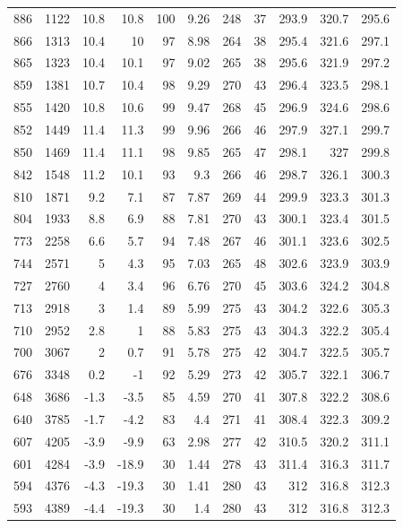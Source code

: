 \documentclass{article}
\begin{document}
\begin{longtable}{r|r|r|r|r|r|r|r|r|r|r}
886 & 1122 & 10.8 & 10.8 & 100 & 9.26 & 248 & 37 & 293.9 & 320.7 & 295.6 \\
866 & 1313 & 10.4 & 10 & 97 & 8.98 & 264 & 38 & 295.4 & 321.6 & 297.1 \\
865 & 1323 & 10.4 & 10.1 & 97 & 9.02 & 265 & 38 & 295.6 & 321.9 & 297.2 \\
859 & 1381 & 10.7 & 10.4 & 98 & 9.29 & 270 & 43 & 296.4 & 323.5 & 298.1 \\
855 & 1420 & 10.8 & 10.6 & 99 & 9.47 & 268 & 45 & 296.9 & 324.6 & 298.6 \\
852 & 1449 & 11.4 & 11.3 & 99 & 9.96 & 266 & 46 & 297.9 & 327.1 & 299.7 \\
850 & 1469 & 11.4 & 11.1 & 98 & 9.85 & 265 & 47 & 298.1 & 327 & 299.8 \\
842 & 1548 & 11.2 & 10.1 & 93 & 9.3 & 266 & 46 & 298.7 & 326.1 & 300.3 \\
810 & 1871 & 9.2 & 7.1 & 87 & 7.87 & 269 & 44 & 299.9 & 323.3 & 301.3 \\
804 & 1933 & 8.8 & 6.9 & 88 & 7.81 & 270 & 43 & 300.1 & 323.4 & 301.5 \\
773 & 2258 & 6.6 & 5.7 & 94 & 7.48 & 267 & 46 & 301.1 & 323.6 & 302.5 \\
744 & 2571 & 5 & 4.3 & 95 & 7.03 & 265 & 48 & 302.6 & 323.9 & 303.9 \\
727 & 2760 & 4 & 3.4 & 96 & 6.76 & 270 & 45 & 303.6 & 324.2 & 304.8 \\
713 & 2918 & 3 & 1.4 & 89 & 5.99 & 275 & 43 & 304.2 & 322.6 & 305.3 \\
710 & 2952 & 2.8 & 1 & 88 & 5.83 & 275 & 43 & 304.3 & 322.2 & 305.4 \\
700 & 3067 & 2 & 0.7 & 91 & 5.78 & 275 & 42 & 304.7 & 322.5 & 305.7 \\
676 & 3348 & 0.2 & -1 & 92 & 5.29 & 273 & 42 & 305.7 & 322.1 & 306.7 \\
648 & 3686 & -1.3 & -3.5 & 85 & 4.59 & 270 & 41 & 307.8 & 322.2 & 308.6 \\
640 & 3785 & -1.7 & -4.2 & 83 & 4.4 & 271 & 41 & 308.4 & 322.3 & 309.2 \\
607 & 4205 & -3.9 & -9.9 & 63 & 2.98 & 277 & 42 & 310.5 & 320.2 & 311.1 \\
601 & 4284 & -3.9 & -18.9 & 30 & 1.44 & 278 & 43 & 311.4 & 316.3 & 311.7 \\
594 & 4376 & -4.3 & -19.3 & 30 & 1.41 & 280 & 43 & 312 & 316.8 & 312.3 \\
593 & 4389 & -4.4 & -19.3 & 30 & 1.4 & 280 & 43 & 312 & 316.8 & 312.3 \\

\end{longtable}
\end{document}
